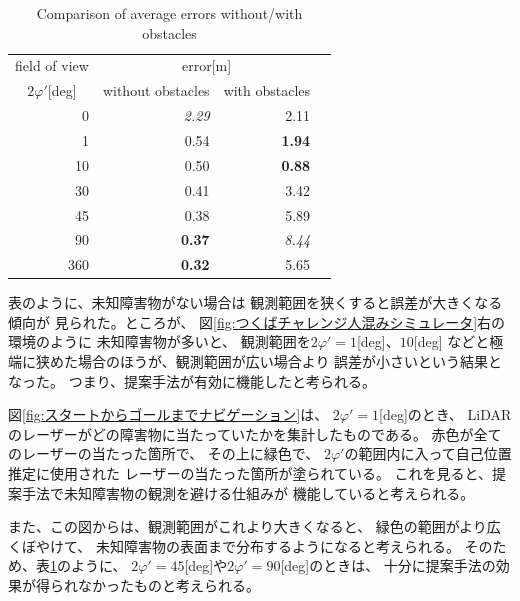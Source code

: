\documentclass{jarticle}
\begin{document}
\begin{table}[htbp]
	\centering
	\caption{Comparison of average errors without/with obstacles}
  \label{table:error}
	\begin{small}
  \begin{tabular}{|r|r|r|r|} \hline
	  field of view & \multicolumn{2}{c|}{error[m]} \\
	  \multicolumn{1}{|c|}{$2\varphi'$[deg]}  & without obstacles & with obstacles \\ \hline \hline
	  {0}         & \textit{2.29} & 2.11 \\ \hline
	  {1}         & 0.54 &  \textbf{1.94} \\ \hline
	  {10}        & 0.50 & \textbf{0.88} \\ \hline
	  {30}        & 0.41 & 3.42 \\ \hline
	  {45}        & 0.38 & 5.89 \\ \hline
	  {90}        & \textbf{0.37} & \textit{8.44}\\ \hline
	  {360}       & \textbf{0.32} & 5.65 \\ \hline
  \end{tabular}
	\end{small}
\end{table}


表のように、未知障害物がない場合は
観測範囲を狭くすると誤差が大きくなる傾向が
見られた。ところが、
図\ref{fig:つくばチャレンジ人混みシミュレータ}右の環境のように
未知障害物が多いと、
観測範囲を$2\varphi'=1$[deg]、$10$[deg]
などと極端に狭めた場合のほうが、観測範囲が広い場合より
誤差が小さいという結果となった。
つまり、提案手法が有効に機能したと考られる。


図\ref{fig:スタートからゴールまでナビゲーション}は、
$2\varphi'=1$[deg]のとき、
LiDARのレーザーがどの障害物に当たっていたかを集計したものである。
赤色が全てのレーザーの当たった箇所で、
その上に緑色で、
$2\varphi'$の範囲内に入って自己位置推定に使用された
レーザーの当たった箇所が塗られている。
これを見ると、提案手法で未知障害物の観測を避ける仕組みが
機能していると考えられる。

また、この図からは、観測範囲がこれより大きくなると、
緑色の範囲がより広くぼやけて、
未知障害物の表面まで分布するようになると考えられる。
そのため、表\ref{table:error}のように、
$2\varphi'=45$[deg]や$2\varphi'=90$[deg]のときは、
十分に提案手法の効果が得られなかったものと考えられる。



%
%
\end{document}
